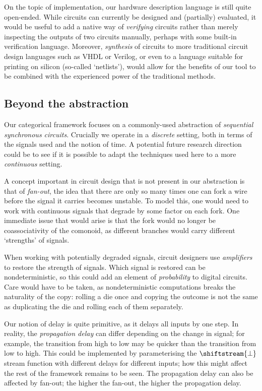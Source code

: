 On the topic of implementation, our hardware description language is still
quite open-ended.
While circuits can currently be designed and (partially) evaluated, it would be
useful to add a native way of \emph{verifying} circuits rather than merely
inspecting the outputs of two circuits manually, perhaps with some built-in
verification language.
Moreover, \emph{synthesis} of circuits to more traditional circuit design
languages such as VHDL or Verilog, or even to a language suitable for printing
on silicon (so-called `netlists'), would allow for the benefits of our tool to
be combined with the experienced power of the traditional methods.

\subsection{Beyond the abstraction}

Our categorical framework focuses on a commonly-used abstraction
of \emph{sequential synchronous circuits}.
Crucially we operate in a \emph{discrete} setting, both in terms of the signals
used and the notion of time.
A potential future research direction could be to see if it is possible to adapt
the techniques used here to a more \emph{continuous} setting.

A concept important in circuit design that is not present in our abstraction is
that of \emph{fan-out}, the idea that there are only so many times one can fork
a wire before the signal it carries becomes unstable.
To model this, one would need to work with continuous signals that degrade by
some factor on each fork.
One immediate issue that would arise is that the fork would no longer be
coassociativity of the comonoid, as different branches would carry different
`strengths' of signals.

When working with potentially degraded signals, circuit designers use
\emph{amplifiers} to restore the strength of signals.
Which signal is restored can be nondeterministic, so this could add an element
of \emph{probability} to digital circuits.
Care would have to be taken, as nondeterministic computations breaks the
naturality of the copy: rolling a die once and copying the outcome is not the
same as duplicating the die and rolling each of them separately.

Our notion of delay is quite primitive, as it delays all inputs by one step.
In reality, the \emph{propagation delay} can differ depending on the change in
signal; for example, the transition from high to low may be quicker than the
transition from low to high.
This could be implemented by parameterising the \(\shiftstream{\bot}\) stream
function with different delays for different inputs; how this might affect the
rest of the framework remains to be seen.
The propagation delay can also be affected by fan-out; the higher the fan-out,
the higher the propagation delay.

